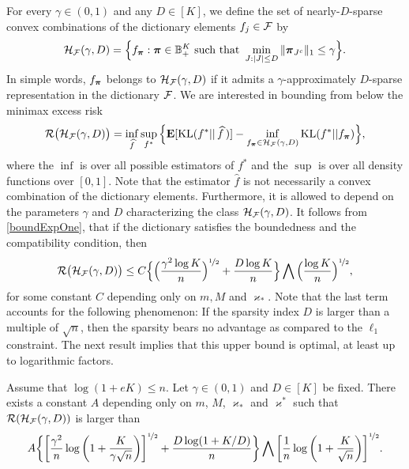 For every $\gamma \in (0,1)$  and any $D\in [K]$, we define the set of nearly-$D$-sparse
convex combinations of the dictionary elements $f_j\in\mathcal F$ by
\begin{equation}
\mathcal H_\mathcal F(\gamma,D) = \Big\{f_{\boldsymbol \pi} : \boldsymbol \pi\in{\mathbb B}^K_+ \text{ such that }
\min_{J:|J|\le D}\|\boldsymbol \pi_{J^c}\|_1\le \gamma \Big\}.
\end{equation}
In simple words, $f_{\boldsymbol \pi}$ belongs to $\mathcal H_\mathcal F(\gamma,D)$ if it admits a $\gamma$-approximately
$D$-sparse representation in the dictionary $\mathcal F$. We are interested in bounding  from
below the minimax excess risk
\begin{equation}
\mathcal R\big(\mathcal H_\mathcal F(\gamma,D)\big) = \inf_{\widehat f} \sup_{f^*}
\Big\{\mathbf E[{\rm KL}(f^*||\,\widehat f\,)] - \inf_{f_{\boldsymbol \pi}\in \mathcal H_\mathcal F(\gamma,D)} {\rm KL}(f^*|| f_{\boldsymbol \pi})\Big\},
\end{equation}
where the $\inf$ is over all possible estimators of $f^*$ and the $\sup$ is over all density functions
over $[0,1]$. Note that the estimator $\hat f$ is not necessarily a convex combination of the
dictionary elements. Furthermore, it is allowed to depend on the parameters $\gamma$ and $D$
characterizing the class $\mathcal H_\mathcal F(\gamma,D)$. It follows from \eqref{boundExpOne}, that if
the dictionary satisfies the boundedness and the compatibility condition, then
\begin{equation}\label{upper}
\mathcal R\big(\mathcal H_\mathcal F(\gamma,D)\big) \le C \Big\{\Big(\frac{\gamma^2\log K}{n}\Big)^{\nicefrac12} + \frac{D\log K}{n}\Big\}\bigwedge \Big(\frac{\log K}{n}\Big)^{\nicefrac12},
\end{equation}
for some constant $C$ depending only on $m,M$ and $\varkappa_*$. Note that the last term  
accounts for the following phenomenon: If the sparsity index $D$ is larger than a multiple 
of $\sqrt{n}$, then the sparsity bears no advantage as compared to the $\ell_1$ constraint. 
The next result implies that this upper bound is optimal, at least up to logarithmic 
factors.

\begin{theorem}
	\label{theorem:lower_bound}
	Assume that $\log(1+eK)\le n$. Let $\gamma\in(0,1)$ and $D\in[K]$ be fixed. There exists 
	a constant $A$ depending only on $m$, $M$, $\varkappa_*$ and  $\varkappa^*$ such that 
	$\mathcal R(\mathcal H_\mathcal F(\gamma,D))$ is larger than
	\begin{align}
	 A \bigg\{\bigg[\frac{\gamma^2}{n}
	\log\bigg(1+\frac{K}{\gamma\sqrt{n}}\bigg)\bigg]^{\nicefrac12}
	+ \frac{D\log(1+K/D)}{n}\bigg\}\bigwedge \bigg[\frac{1}{n}
	\log\bigg(1+\frac{K}{\sqrt{n}}\bigg)\bigg]^{\nicefrac12}.
	\end{align}
\end{theorem}

